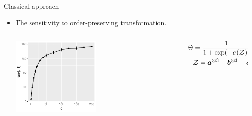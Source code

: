 \documentclass[10pt, mathserif]{beamer} %
\theoremstyle{definition}
\theoremstyle{plain}
\begin{document}
\begin{frame}{Classical approach}
 \begin{itemize}         
    \item The sensitivity to order-preserving transformation.
      \begin{columns}
\begin{column}{0.6\textwidth}
   \begin{center}
     \includegraphics[width=0.5\textwidth]{example1.pdf}
     \end{center}
\end{column}
\begin{column}{0.5\textwidth} 
\begin{align}\Theta &= {1\over 1+\exp(-c\left(\mathcal{Z}\right))},\quad\text{ where }\\&\mathcal{Z} = \bm a^{\otimes3}+ \bm b^{\otimes3}+ \bm c^{\otimes3}.\end{align}

\end{column}
\end{columns}
      
\end{itemize}
\end{frame}
\end{document}
